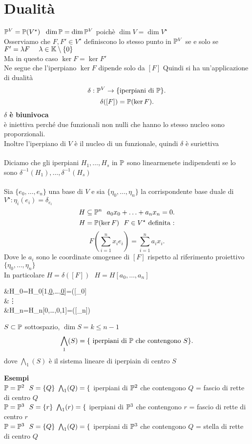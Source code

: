 \documentclass[12px]{article}
\begin{document}
	 \section{Dualità}
	 $\pro^V=\pro(V^\star)\ \ \dim\pro=\dim\pro^V$ poichè  $\dim V=\dim V^\star$\\
	 Osserviamo che  $F,F'\in V^\star$ definiscono lo stesso punto in  $\mathbb{P}^V$ se e solo se  \\$F'= \lambda F\ \ \ \ \lambda\in\K\setminus\{0\}$\\
	 Ma in questo caso $\ker F = \ker F'$\\
	 Ne segue che l'iperpiano  $\ker F$ dipende solo da  $[F]$ Quindi si ha un'applicazione di dualità 
	  \[
		  \delta :\mathbb{P}^V \rightarrow \{\text{iperpiani di }\mathbb{P}\}
	 .\] 
	 \[
		 \delta([F]) = \mathbb{P}(\ker F)
	 .\] 
	 \textbf{$\delta$ è biunivoca}\\
	 è iniettiva perché due funzionali non nulli che hanno lo stesso nucleo sono proporzionali.\\
	 Inoltre l'iperpiano di $V$ è il nucleo di un funzionale, quindi  $\delta$ è suriettiva\\
	 \ \hline \ \\
	 Diciamo che gli iperpiani $H_1,\ldots,H_s$ in $\mathbb{P}$ sono linearmenete indipendenti se lo sono $\delta^{-1}(H_1),\ldots,\delta^{-1}(H_s)$ \ \\ \hline \ \\
	 Sia $\{e_0,\ldots,e_n\}$ una base di $V$ e sia $\{\eta_0,\ldots,\eta_n\}$ la corrispondente base duale di $V^\star:\eta_i(e_i)=\delta_{e_i}$ 
	 \[
	 H\subseteq \pro^n \ \ a_0x_0+\ldots+a_nx_n=0
	 .\] 
\[
	H = \mathbb{P}(\ker F) \ \ F\in V^\star \text{ definita :}
\] 
\[
F(\sum^n_{i=1}x_ie_i)=\sum^n_{i=1}a_ix_i
.\] 
Dove le $a_i$ sono le coordinate omogenee di  $[F] $ rispetto al riferimento proiettivo  $\{\eta_0,\ldots,\eta_n\}$\\
In particolare $H=\delta([F]) \ \ \ H=H[a_0,\ldots,a_n]$ \\
\begin{aligend}
	&H_0=H_0[1,\underline{0},\ldots,\underline{0}]=\delta([\eta_0]\\
	&\vdots\\
	&H_n=H_n[0,\ldots,0,1]=\delta([\eta_n])
\end{aligend}
\begin{defi}
	$S\subset \mathbb{P}$ sottospazio,  $\dim S = k \leq n-1$
	\[
		\bigwedge_1(S) = \{\text{ iperpiani di }\mathbb{P} \text{ che contengono } S\}
	.\] 
	dove $\bigwedge_1(S)$ è il sistema lineare di iperpiain di centro $S$
\end{defi}
\textbf{Esempi}\\
$\mathbb{P}=\mathbb{P}^2 \ \ S = \{Q\}\ \ \\
\bigwedge_1(Q) = \{$ iperpiani di $\mathbb{P}^2$  che contengono $Q$ = fascio di rette di centro $Q$\\
$\mathbb{P}=\mathbb{P}^3 \ \ S = \{r\}\ \ \\ \bigwedge_1(r) = \{$ iperpiani di $\mathbb{P}^3$ che contengono $r$ = fascio di rette di centro $r$\\
$\mathbb{P}=\mathbb{P}^3 \ \ S = \{Q\}\ \ \\ \bigwedge_1(Q) = \{$ iperpiani di $\mathbb{P}^3$ che contengono $Q$ = stella di rette di centro $Q$\\
\end{document}
